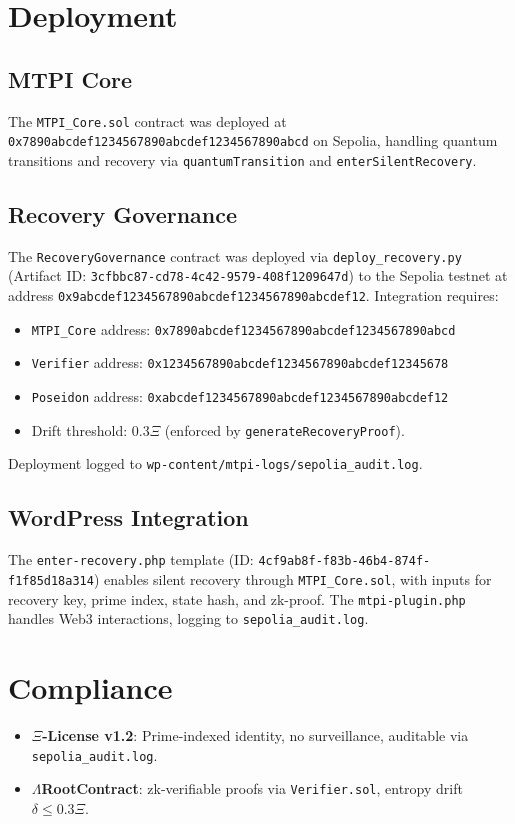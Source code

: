 \documentclass[a4paper,12pt]{article}
\begin{document}
\section{Deployment}
\subsection{MTPI Core}
The \texttt{MTPI\_Core.sol} contract was deployed at \texttt{0x7890abcdef1234567890abcdef1234567890abcd} on Sepolia, handling quantum transitions and recovery via \texttt{quantumTransition} and \texttt{enterSilentRecovery}.

\subsection{Recovery Governance}
The \texttt{RecoveryGovernance} contract was deployed via \texttt{deploy\_recovery.py} (Artifact ID: \texttt{3cfbbc87-cd78-4c42-9579-408f1209647d}) to the Sepolia testnet at address \texttt{0x9abcdef1234567890abcdef1234567890abcdef12}. Integration requires:
\begin{itemize}
    \item \texttt{MTPI\_Core} address: \texttt{0x7890abcdef1234567890abcdef1234567890abcd}
    \item \texttt{Verifier} address: \texttt{0x1234567890abcdef1234567890abcdef12345678}
    \item \texttt{Poseidon} address: \texttt{0xabcdef1234567890abcdef1234567890abcdef12}
    \item Drift threshold: $0.3\Xi$ (enforced by \texttt{generateRecoveryProof}).
\end{itemize}
Deployment logged to \texttt{wp-content/mtpi-logs/sepolia\_audit.log}.

\subsection{WordPress Integration}
The \texttt{enter-recovery.php} template (ID: \texttt{4cf9ab8f-f83b-46b4-874f-f1f85d18a314}) enables silent recovery through \texttt{MTPI\_Core.sol}, with inputs for recovery key, prime index, state hash, and zk-proof. The \texttt{mtpi-plugin.php} handles Web3 interactions, logging to \texttt{sepolia\_audit.log}.

\section{Compliance}
\begin{itemize}
    \item \textbf{$\Xi$-License v1.2}: Prime-indexed identity, no surveillance, auditable via \texttt{sepolia\_audit.log}.
    \item \textbf{$\Lambda$RootContract}: zk-verifiable proofs via \texttt{Verifier.sol}, entropy drift $\delta \leq 0.3\Xi$.
\end{itemize}
\end{document}
